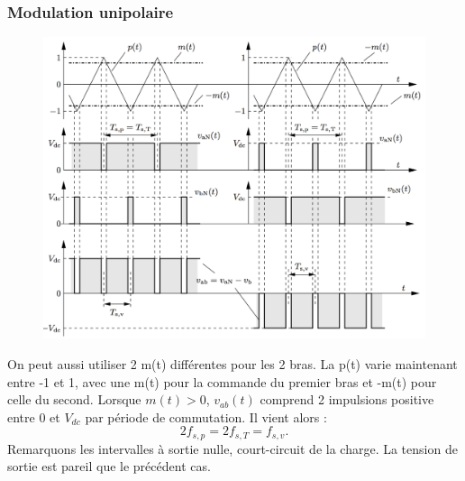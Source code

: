 		\subsubsection{Modulation unipolaire}
			\begin{figure}
			\vspace{-5mm}
			\includegraphics[scale=0.25]{ch4/11}
			\end{figure}
			On peut aussi utiliser 2 m(t) différentes pour les 2 bras. La p(t) varie maintenant entre -1 et 1, avec une m(t) pour la commande du premier bras et -m(t) pour celle du second. Lorsque $m(t) > 0$, $v_{ab}(t)$ comprend 2 impulsions positive entre 0 et $V_{dc}$ par période de commutation. Il vient alors :
			\begin{equation}
				2 f_{s,p} = 2f_{s,T} = f_{s,v}.
			\end{equation}
			Remarquons les intervalles à sortie nulle, court-circuit de la charge. La tension de sortie est pareil que le précédent cas. \\
			
